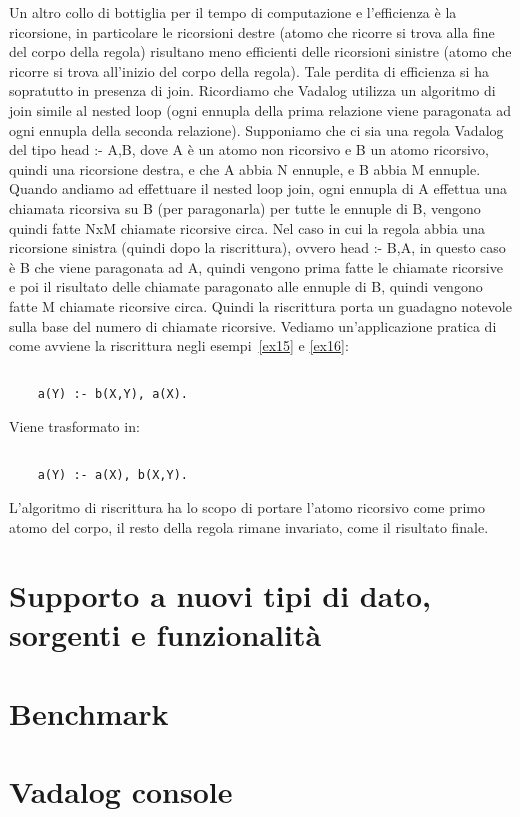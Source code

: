 Un altro collo di bottiglia per il tempo di computazione e l'efficienza è la ricorsione, in particolare le ricorsioni destre (atomo che ricorre si trova alla fine del corpo della regola) risultano meno efficienti delle ricorsioni sinistre (atomo che ricorre si trova all'inizio del corpo della regola). \newline
Tale perdita di efficienza si ha sopratutto in presenza di join. Ricordiamo che Vadalog utilizza un algoritmo di join simile al nested loop (ogni ennupla della prima relazione viene paragonata ad ogni ennupla della seconda relazione). \newline
Supponiamo che ci sia una regola Vadalog del tipo head :- A,B, dove A è un atomo non ricorsivo e B un atomo ricorsivo, quindi una ricorsione destra, e che A abbia N ennuple, e B abbia M ennuple. \newline
Quando andiamo ad effettuare il nested loop join, ogni ennupla di A effettua una chiamata ricorsiva su B (per paragonarla) per tutte le ennuple di B, vengono quindi fatte NxM chiamate ricorsive circa. \newline
Nel caso in cui la regola abbia una ricorsione sinistra (quindi dopo la riscrittura), ovvero head :- B,A, in  questo caso è B che viene paragonata ad A, quindi vengono prima fatte le chiamate ricorsive e poi il risultato delle chiamate paragonato alle ennuple di B, quindi vengono fatte M chiamate ricorsive circa. Quindi la riscrittura porta un guadagno notevole sulla base del numero di chiamate ricorsive. \newline
Vediamo un'applicazione pratica di come avviene la riscrittura negli esempi~\ref{ex15} e \ref{ex16}: 
\begin{example}\label{ex15}
	\begin{lstlisting}
	
	a(Y) :- b(X,Y), a(X).
	\end{lstlisting}
\end{example}
Viene trasformato in:
\begin{example}\label{ex16}
	\begin{lstlisting}
	
	a(Y) :- a(X), b(X,Y).
	\end{lstlisting}
\end{example}
L'algoritmo di riscrittura ha lo scopo di portare l'atomo ricorsivo come primo atomo del corpo, il resto della regola rimane invariato, come il risultato finale.

\section{Supporto a nuovi tipi di dato, sorgenti e funzionalità}

\section{Benchmark}

\section{Vadalog console}